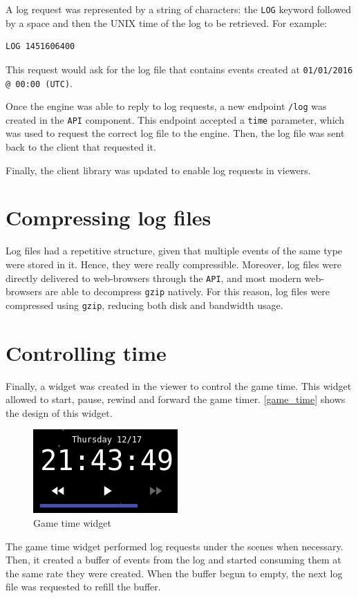 \documentclass[a4paper,11pt,titlepage,abstract,numbers=noenddot,automark,mnsy,intlimits,rgb,dvipsnames]{report}
\begin{document}
A log request was represented by a string of characters: the \texttt{LOG} keyword followed by a space and then the UNIX time
of the log to be retrieved. For example:
\begin{verbatim}
LOG 1451606400
\end{verbatim}
This request would ask for the log file that contains events created at \texttt{01/01/2016 @ 00:00 (UTC)}.

Once the engine was able to reply to log requests, a new endpoint \texttt{/log} was created in the \texttt{API} component. This
endpoint accepted a \texttt{time} parameter, which was used to request the correct log file to the engine. Then, the log
file was sent back to the client that requested it.

Finally, the client library was updated to enable log requests in viewers.
\section{Compressing log files}
Log files had a repetitive structure, given that multiple events of the same type were stored in it. Hence, they were
really compressible. Moreover, log files were directly delivered to web-browsers through the \texttt{API}, and most modern
web-browsers are able to decompress \texttt{gzip} natively. For this reason, log files were compressed using \texttt{gzip},
reducing both disk and bandwidth usage.
\section{Controlling time}
Finally, a widget was created in the viewer to control the game time. This widget allowed to start, pause,
rewind and forward the game timer. \autoref{game_time} shows the design of this widget.
\begin{figure}[H]
\begin{center}
\includegraphics{images/game_time.png}
\end{center}
\caption{Game time widget}
\label{game_time}
\end{figure}
The game time widget performed log requests under the scenes when necessary. Then, it created a buffer of events
from the log and started consuming them at the same rate they were created. When the buffer begun to empty, the next log file
was requested to refill the buffer.
\end{document}
